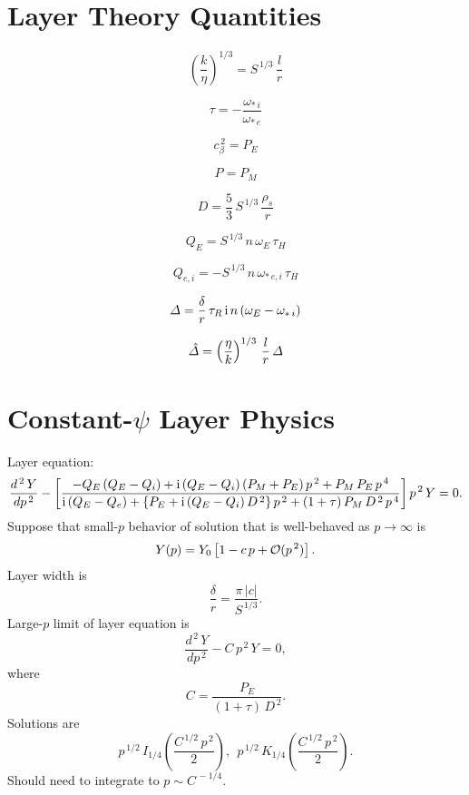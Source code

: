\documentclass[notitlepage,12pt]{article}
\begin{document}
\section{Layer Theory Quantities}
\begin{description}
\item 
$$
\left(\frac{k}{\eta}\right)^{1/3} = S^{\,1/3}\,\frac{l}{r}
$$
\item
$$
\tau = -\frac{\omega_{\ast\,i}}{\omega_{\ast\,e}}
$$
\item
$$
 c_\beta^{\,2} = P_E
 $$
 \item
 $$
 P=P_M
 $$
\item 
$$
D= \frac{5}{3}\,S^{\,1/3}\,\frac{\rho_s}{r}
$$ 
\item 
$$
Q_E= S^{\,1/3}\,n\,\omega_E\,\tau_H
$$
\item 
$$
Q_{e,i}= -S^{\,1/3}\,n\,\omega_{\ast\,e,i}\,\tau_H
$$
\item 
$$
{\mit\Delta} = \frac{\delta}{r}\,\tau_R\,{\rm i}\,n\,(\omega_E-\omega_{\ast\,i})
$$
\item 
$$
\hat{\mit\Delta} = \left(\frac{\eta}{k}\right)^{1/3} \,\frac{l}{r}\,{\mit\Delta}
$$

\section{Constant-$\psi$ Layer Physics}
Layer equation:
$$
\frac{d^{\,2}\,Y}{dp^{\,2}} -\left[\frac{-Q_E\,(Q_E-Q_i)+{\rm i}\,(Q_E-Q_i)\,(P_M+P_E)\,p^{\,2}+
P_M\,P_E\,p^{\,4}}
{{\rm i}\,(Q_E-Q_e) +\{P_E + {\rm i}\,(Q_E-Q_i)\,D^{\,2}\}\,p^{\,2}+(1+\tau)\,P_M\,D^{\,2}\,p^{\,4}}
\right] p^{\,2}\, Y = 0.
$$
Suppose that small-$p$ behavior of solution that is well-behaved as $p\rightarrow \infty$ is
$$
Y(p) = Y_0\left[1 - c\,p+{\cal O}(p^{\,2})\right].
$$
Layer width is 
$$
\frac{\delta}{r} = \frac{\pi\,|c|}{S^{\,1/3}}.
$$
Large-$p$ limit of layer equation
is
$$
\frac{d^{\,2}\,Y}{dp^{\,2}} - C\, p^{\,2}\, Y = 0,
$$
where
$$
C = \frac{P_E}{(1+\tau)\,D^{\,2}}.
$$
Solutions are
$$
p^{\,1/2}\,I_{1/4}\left(\frac{C^{\,1/2}\,p^{\,2}}{2}\right),~~ p^{\,1/2}\,K_{1/4}\left(\frac{C^{\,1/2}\,p^{\,2}}{2}\right).
$$
Should need to integrate to $p\sim C^{\,-1/4}$. 



\end{description}
\end{document}
